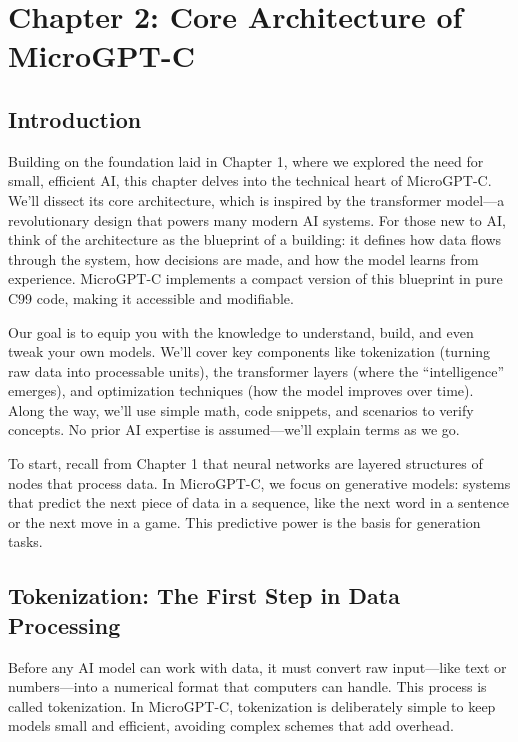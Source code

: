 \documentclass[
]{article}
\begin{document}
\section{Chapter 2: Core Architecture of
MicroGPT-C}\label{chapter-2-core-architecture-of-microgpt-c}

\subsection{Introduction}\label{introduction-1}

Building on the foundation laid in Chapter 1, where we explored the need
for small, efficient AI, this chapter delves into the technical heart of
MicroGPT-C. We'll dissect its core architecture, which is inspired by
the transformer model---a revolutionary design that powers many modern
AI systems. For those new to AI, think of the architecture as the
blueprint of a building: it defines how data flows through the system,
how decisions are made, and how the model learns from experience.
MicroGPT-C implements a compact version of this blueprint in pure C99
code, making it accessible and modifiable.

Our goal is to equip you with the knowledge to understand, build, and
even tweak your own models. We'll cover key components like tokenization
(turning raw data into processable units), the transformer layers (where
the ``intelligence'' emerges), and optimization techniques (how the
model improves over time). Along the way, we'll use simple math, code
snippets, and scenarios to verify concepts. No prior AI expertise is
assumed---we'll explain terms as we go.

To start, recall from Chapter 1 that neural networks are layered
structures of nodes that process data. In MicroGPT-C, we focus on
generative models: systems that predict the next piece of data in a
sequence, like the next word in a sentence or the next move in a game.
This predictive power is the basis for generation tasks.

\subsection{Tokenization: The First Step in Data
Processing}\label{tokenization-the-first-step-in-data-processing}

Before any AI model can work with data, it must convert raw input---like
text or numbers---into a numerical format that computers can handle.
This process is called tokenization. In MicroGPT-C, tokenization is
deliberately simple to keep models small and efficient, avoiding complex
schemes that add overhead.
\end{document}
